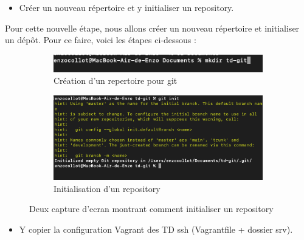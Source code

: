 \documentclass[12pt]{article}
\begin{document}
\vspace{0.3cm}

\begin{itemize}
  \item Créer un nouveau répertoire et y initialiser un repository.
\end{itemize}

Pour cette nouvelle étape, nous allons créer un nouveau répertoire et initialiser un dépôt. Pour ce faire, voici les étapes ci-dessous :

\vspace{0.3cm}

\begin{figure}[h]
  \centering
  \begin{subfigure}{0.30\textwidth}
    \centering
    \includegraphics[width=\textwidth]{Images-TD-Git/Image-TD-Git-1/new-directory.png}
    \caption{Création d'un repertoire pour git}
  \end{subfigure}
  \vspace{0.9cm} %
  \begin{subfigure}{0.45\textwidth}
    \centering
    \includegraphics[width=\textwidth]{Images-TD-Git/Image-TD-Git-1/git-init.png}
    \caption{Initialisation d'un repository}
  \end{subfigure}
  \caption{Deux capture d'ecran montrant comment initialiser un repository}
\end{figure}

\vspace{0.3cm}

\begin{itemize}
  \item Y copier la configuration Vagrant des TD ssh (Vagrantfile + dossier srv).
\end{itemize}
\end{document}
